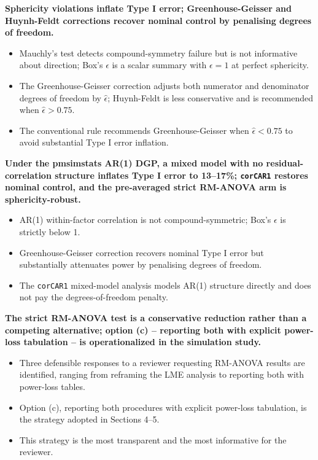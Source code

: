 \documentclass[
  11pt,
]{article}
\begin{document}
\textbf{Sphericity violations inflate Type I error; Greenhouse-Geisser and Huynh-Feldt corrections recover nominal control by penalising degrees of freedom.}

\begin{itemize}\setlength{\itemsep}{2pt}\setlength{\parskip}{0pt}
\item Mauchly's test detects compound-symmetry failure but is not informative about direction; Box's $\epsilon$ is a scalar summary with $\epsilon = 1$ at perfect sphericity.
\item The Greenhouse-Geisser correction adjusts both numerator and denominator degrees of freedom by $\hat{\epsilon}$; Huynh-Feldt is less conservative and is recommended when $\hat{\epsilon} > 0.75$.
\item The conventional rule recommends Greenhouse-Geisser when $\hat{\epsilon} < 0.75$ to avoid substantial Type I error inflation.
\end{itemize}

\textbf{Under the pmsimstats AR(1) DGP, a mixed model with no residual-correlation structure inflates Type I error to 13--17\%; \texttt{corCAR1} restores nominal control, and the pre-averaged strict RM-ANOVA arm is sphericity-robust.}

\begin{itemize}\setlength{\itemsep}{2pt}\setlength{\parskip}{0pt}
\item AR(1) within-factor correlation is not compound-symmetric; Box's $\epsilon$ is strictly below 1.
\item Greenhouse-Geisser correction recovers nominal Type I error but substantially attenuates power by penalising degrees of freedom.
\item The \texttt{corCAR1} mixed-model analysis models AR(1) structure directly and does not pay the degrees-of-freedom penalty.
\end{itemize}

\textbf{The strict RM-ANOVA test is a conservative reduction rather than a competing alternative; option (c) -- reporting both with explicit power-loss tabulation -- is operationalized in the simulation study.}

\begin{itemize}\setlength{\itemsep}{2pt}\setlength{\parskip}{0pt}
\item Three defensible responses to a reviewer requesting RM-ANOVA results are identified, ranging from reframing the LME analysis to reporting both with power-loss tables.
\item Option (c), reporting both procedures with explicit power-loss tabulation, is the strategy adopted in Sections 4--5.
\item This strategy is the most transparent and the most informative for the reviewer.
\end{itemize}
\end{document}
